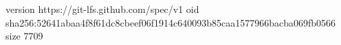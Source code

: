version https://git-lfs.github.com/spec/v1
oid sha256:52641abaa4f8f61dc8cbeef06f1914c640093b85caa1577966bacba069fb0566
size 7709
